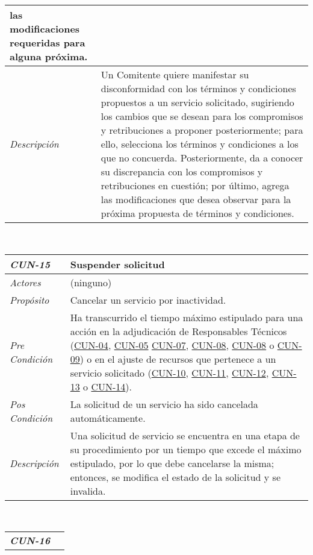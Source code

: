 \begin{center}
{\begin{tabular}{ | p{3cm} | p{12.5cm} | }
	las modificaciones requeridas para alguna pr\'oxima. \\
	\hline
	\raggedleft \textit{Descripci\'on} &
	Un Comitente quiere manifestar su disconformidad con
	los t\'erminos y condiciones propuestos a un servicio
	solicitado, sugiriendo los cambios que se desean para
	los compromisos y retribuciones a proponer posteriormente;
	para ello, selecciona los t\'erminos y condiciones
	a los que no concuerda. Posteriormente, da a conocer
	su discrepancia con los compromisos y retribuciones en
	cuesti\'on; por \'ultimo, agrega las modificaciones que
	desea observar para la pr\'oxima propuesta de t\'erminos
	y condiciones. \\
	\hline
\end{tabular}} \\[1cm]
\hypertarget{CUN-15}{%
\begin{tabular}{ | p{3cm} | p{12.5cm} | }
	\hline
	\rowcolor{lightgray}
	\hfil \textbf{\textit{CUN-15}} &
	\hfil \textbf{Suspender solicitud} \\
	\hline
	\raggedleft \textit{Actores} & (ninguno) \\
	\hline
	\raggedleft \textit{Prop\'osito} & Cancelar un servicio
	por inactividad. \\
	\hline
	\raggedleft \textit{Pre Condici\'on} & Ha transcurrido
	el tiempo m\'aximo estipulado para una acci\'on en
	la adjudicaci\'on de Responsables T\'ecnicos
	(\hyperlink{CUN-04}{CUN-04}, \hyperlink{CUN-05}{CUN-05}
	\hyperlink{CUN-07}{CUN-07}, \hyperlink{CUN-08}{CUN-08},
	\hyperlink{CUN-08}{CUN-08} o \hyperlink{CUN-09}{CUN-09})
	o en el ajuste de recursos que pertenece a un servicio
	solicitado (\hyperlink{CUN-10}{CUN-10},
	\hyperlink{CUN-11}{CUN-11}, \hyperlink{CUN-12}{CUN-12},
	\hyperlink{CUN-13}{CUN-13} o \hyperlink{CUN-14}{CUN-14}). \\
	\hline
	\raggedleft \textit{Pos Condici\'on} & La solicitud
	de un servicio ha sido cancelada autom\'aticamente. \\
	\hline
	\raggedleft \textit{Descripci\'on} &
	Una solicitud de servicio se encuentra en una etapa de
	su procedimiento por un tiempo que excede el m\'aximo
	estipulado, por lo que debe cancelarse la misma; entonces,
	se modifica el estado de la solicitud y se invalida. \\
	\hline
\end{tabular}} \\[1cm]
\hypertarget{CUN-16}{%
\begin{tabular}{ | p{3cm} | p{12.5cm} | }
	\hline
	\rowcolor{lightgray}
	\hfil \textbf{\textit{CUN-16}} &

\end{tabular}}
\end{center}
